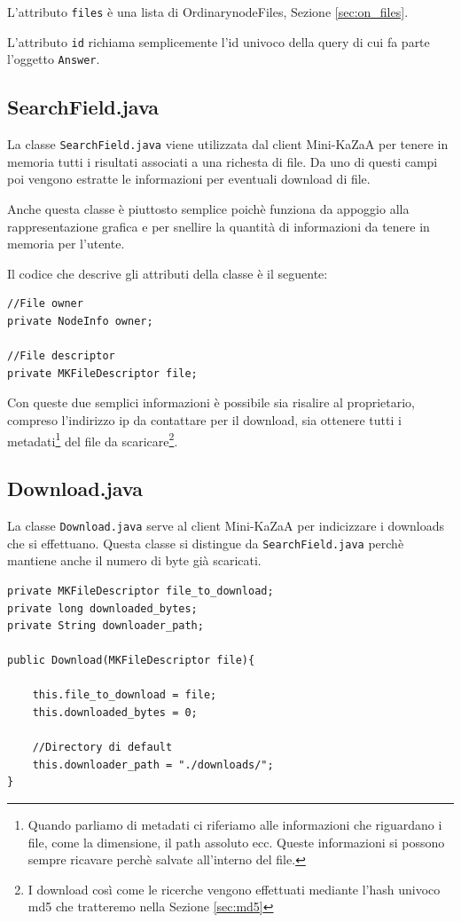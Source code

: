 L'attributo \verb|files| è una lista di OrdinarynodeFiles, Sezione \ref{sec:on_files}.

L'attributo \verb|id| richiama semplicemente l'id univoco della query di cui fa parte l'oggetto \verb|Answer|.

\subsection{SearchField.java}\label{sec:searchField_class}
La classe \verb|SearchField.java| viene utilizzata dal client Mini-KaZaA per tenere in memoria tutti i risultati
associati a una richesta di file.
Da uno di questi campi poi vengono estratte le informazioni per eventuali download di file.

Anche questa classe è piuttosto semplice poichè funziona da appoggio alla rappresentazione grafica e per snellire
la quantità di informazioni da tenere in memoria per l'utente.

Il codice che descrive gli attributi della classe è il seguente:
\newline
\begin{lstlisting}
//File owner
private NodeInfo owner;

//File descriptor
private MKFileDescriptor file;
\end{lstlisting}

Con queste due semplici informazioni è possibile sia risalire al proprietario, compreso l'indirizzo ip da contattare
per il download, sia ottenere tutti i metadati\footnote{Quando parliamo di metadati ci riferiamo alle informazioni che riguardano i file, come la dimensione, il path assoluto ecc. Queste informazioni si possono sempre ricavare perchè salvate all'interno del file.} del file da scaricare\footnote{I download così come le ricerche vengono
effettuati mediante l'hash univoco md5 che tratteremo nella Sezione \ref{sec:md5}}.

\subsection{Download.java}\label{sec:download_class}
La classe \verb|Download.java| serve al client Mini-KaZaA per indicizzare i downloads che si effettuano. Questa classe si distingue da \verb|SearchField.java| perchè mantiene anche il numero di byte già scaricati.
\newline
\begin{lstlisting}
private MKFileDescriptor file_to_download;
private long downloaded_bytes;
private String downloader_path;

public Download(MKFileDescriptor file){

	this.file_to_download = file;
	this.downloaded_bytes = 0;

	//Directory di default
	this.downloader_path = "./downloads/";
}
\end{lstlisting}

